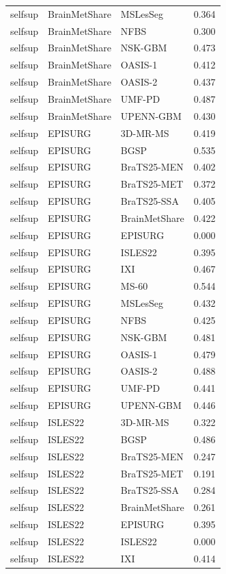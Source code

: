 \begin{tabular}{lllr}
selfsup & BrainMetShare & MSLesSeg & 0.364 \\
selfsup & BrainMetShare & NFBS & 0.300 \\
selfsup & BrainMetShare & NSK-GBM & 0.473 \\
selfsup & BrainMetShare & OASIS-1 & 0.412 \\
selfsup & BrainMetShare & OASIS-2 & 0.437 \\
selfsup & BrainMetShare & UMF-PD & 0.487 \\
selfsup & BrainMetShare & UPENN-GBM & 0.430 \\
selfsup & EPISURG & 3D-MR-MS & 0.419 \\
selfsup & EPISURG & BGSP & 0.535 \\
selfsup & EPISURG & BraTS25-MEN & 0.402 \\
selfsup & EPISURG & BraTS25-MET & 0.372 \\
selfsup & EPISURG & BraTS25-SSA & 0.405 \\
selfsup & EPISURG & BrainMetShare & 0.422 \\
selfsup & EPISURG & EPISURG & 0.000 \\
selfsup & EPISURG & ISLES22 & 0.395 \\
selfsup & EPISURG & IXI & 0.467 \\
selfsup & EPISURG & MS-60 & 0.544 \\
selfsup & EPISURG & MSLesSeg & 0.432 \\
selfsup & EPISURG & NFBS & 0.425 \\
selfsup & EPISURG & NSK-GBM & 0.481 \\
selfsup & EPISURG & OASIS-1 & 0.479 \\
selfsup & EPISURG & OASIS-2 & 0.488 \\
selfsup & EPISURG & UMF-PD & 0.441 \\
selfsup & EPISURG & UPENN-GBM & 0.446 \\
selfsup & ISLES22 & 3D-MR-MS & 0.322 \\
selfsup & ISLES22 & BGSP & 0.486 \\
selfsup & ISLES22 & BraTS25-MEN & 0.247 \\
selfsup & ISLES22 & BraTS25-MET & 0.191 \\
selfsup & ISLES22 & BraTS25-SSA & 0.284 \\
selfsup & ISLES22 & BrainMetShare & 0.261 \\
selfsup & ISLES22 & EPISURG & 0.395 \\
selfsup & ISLES22 & ISLES22 & 0.000 \\
selfsup & ISLES22 & IXI & 0.414 \\

\end{tabular}
